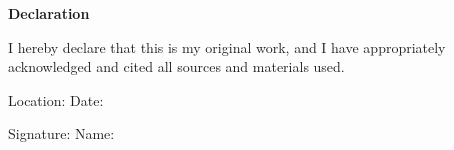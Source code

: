 \thispagestyle{empty}


\begin{center}
\textbf{\Large Declaration}
\end{center}

\vspace{15mm}

\noindent
I hereby declare that this \MakeLowercase{\getDoctype{}} is my original work, and I have appropriately acknowledged and cited all sources and materials used.

\vspace{15mm}

\noindent
Location: \getSubmissionLocation{} \hfill Date: \getSubmissionDate{}

\vspace{15mm}

\noindent
Signature: \underline{\hspace{6cm}} \hfill Name: \getAuthor{}

\cleardoublepage{}


